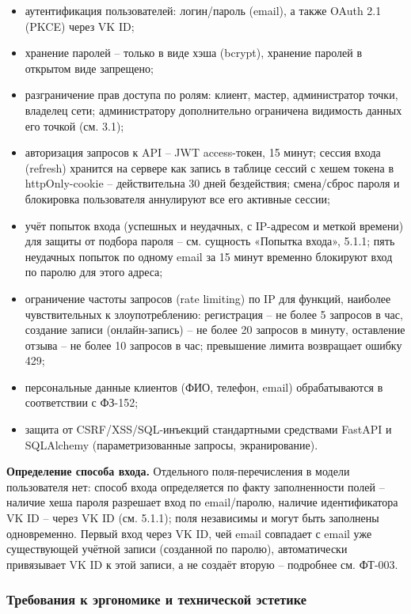 \begin{itemize}
  \item аутентификация пользователей: логин/пароль (email), а также OAuth 2.1 (PKCE) через VK ID;
  \item хранение паролей -- только в виде хэша (bcrypt), хранение паролей в открытом виде запрещено;
  \item разграничение прав доступа по ролям: клиент, мастер, администратор точки, владелец сети; администратору дополнительно ограничена видимость данных его точкой (см. 3.1);
  \item авторизация запросов к API -- JWT access-токен, 15 минут; сессия входа (refresh) хранится на сервере как запись в таблице сессий с хешем токена в httpOnly-cookie -- действительна 30 дней бездействия; смена/сброс пароля и блокировка пользователя аннулируют все его активные сессии;
  \item учёт попыток входа (успешных и неудачных, с IP-адресом и меткой времени) для защиты от подбора пароля -- см. сущность «Попытка входа», 5.1.1; пять неудачных попыток по одному email за 15 минут временно блокируют вход по паролю для этого адреса;
  \item ограничение частоты запросов (rate limiting) по IP для функций, наиболее чувствительных к злоупотреблению: регистрация -- не более 5 запросов в час, создание записи (онлайн-запись) -- не более 20 запросов в минуту, оставление отзыва -- не более 10 запросов в час; превышение лимита возвращает ошибку 429;
  \item персональные данные клиентов (ФИО, телефон, email) обрабатываются в соответствии с ФЗ-152;
  \item защита от CSRF/XSS/SQL-инъекций стандартными средствами FastAPI и SQLAlchemy (параметризованные запросы, экранирование).
\end{itemize}

\textbf{Определение способа входа.} Отдельного поля-перечисления в модели пользователя нет: способ входа определяется по факту заполненности полей -- наличие хеша пароля разрешает вход по email/паролю, наличие идентификатора VK ID -- через VK ID (см. 5.1.1); поля независимы и могут быть заполнены одновременно. Первый вход через VK ID, чей email совпадает с email уже существующей учётной записи (созданной по паролю), автоматически привязывает VK ID к этой записи, а не создаёт вторую -- подробнее см. ФТ-003.

\subsubsection{Требования к эргономике и технической эстетике}

